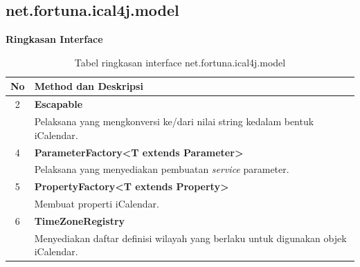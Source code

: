 \subsection{net.fortuna.ical4j.model}
\label{subs:net.fortuna.ical4j.model}
\noindent \textbf{Ringkasan Interface}\cite{ical}
\begin{table}[H]
		\centering
		\caption{Tabel ringkasan interface net.fortuna.ical4j.model}
		\label{tab:net.fortuna.ical4j.model}
	\begin{tabular}{|c|p{12cm}|}
		\hline
		\textbf{No} & \textbf{Method dan Deskripsi} \\ \hline \hline
		2 & \textbf{Escapable}\\
			&	Pelaksana yang mengkonversi ke/dari nilai string kedalam bentuk iCalendar.\\ \hline
		4 & \textbf{ParameterFactory<T extends Parameter>}\\
			&	Pelaksana yang menyediakan pembuatan \textit{service} parameter.\\ \hline
		5 & \textbf{PropertyFactory<T extends Property>}\\
			&	Membuat properti iCalendar.\\ \hline
		6 & \textbf{TimeZoneRegistry}\\
			&	Menyediakan daftar definisi wilayah yang berlaku untuk digunakan objek iCalendar.\\ \hline
	\end{tabular}
\end{table}

